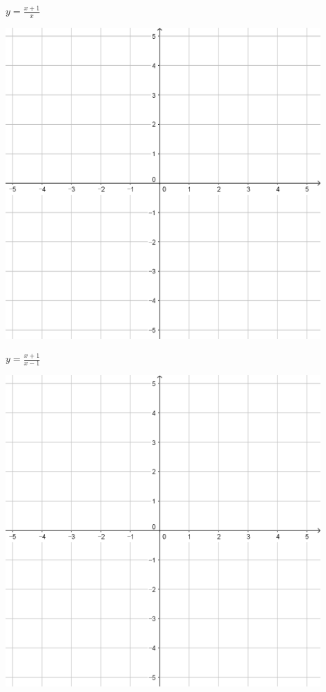\documentclass{oblivoir}
\begin{document}
\clearpage
\begin{minipage}{0.45\textwidth}\centering
\(y=\frac{x+1}{x}\)
\par\bigskip\includegraphics[width=0.9\textwidth]{55}
\end{minipage}
\begin{minipage}{0.45\textwidth}\centering
\(y=\frac{x+1}{x-1}\)
\par\bigskip\includegraphics[width=0.9\textwidth]{55}
\end{minipage}\bigskip\bigskip\par
\end{document}

